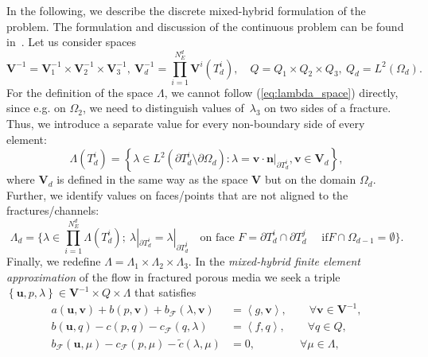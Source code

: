 In the following, we describe the discrete mixed-hybrid formulation of the
problem. The formulation and discussion of the continuous problem can be found
in~\cite{Brezina-2010-MHF}. Let us consider spaces%
\begin{equation}
\mathbf{V}^{-1}=\mathbf{V}_{1}^{-1}\times\mathbf{V}_{2}^{-1}\times
\mathbf{V}_{3}^{-1},\ \mathbf{V}_{d}^{-1}=\prod_{i=1}^{N_{E}^{d}}%
\mathbf{V}^{i}(T_{d}^{i}),\quad Q=Q_{1}\times Q_{2}\times Q_{3},\ 
Q_{d}=L^{2}\left(  \Omega_{d}\right)  .
\end{equation}
For the definition of the space $\Lambda$, we cannot follow
(\ref{eq:lambda_space}) directly, since e.g. on $\Omega_{2}$, we need to
distinguish values of~$\lambda_{3}$ on two sides of a fracture. Thus, we
introduce a separate value for every non-boundary side of every element:
\begin{equation}
\Lambda(T_{d}^{i})=\left\{  \lambda\in L^{2}(\partial T_{d}^{i} \setminus \partial\Omega_d):\lambda
=\mathbf{v}\cdot\mathbf{n}|_{\partial T_{d}^{i}},\mathbf{v}\in\mathbf{V}%
_{d}\right\}  ,
\end{equation}
where $\mathbf{V}_{d}$ is defined in the same way as the space $\mathbf{V}$
but on the domain $\Omega_{d}$. Further, we identify values on faces/points
that are not aligned to the fractures/channels:
\begin{equation}
\Lambda_{d}=\Big\{\lambda\in\prod_{i=1}^{N_{E}^{d}}\Lambda(T_{d}%
^{i});\ \lambda|_{\partial T_{d}^{i}}=\lambda|_{\partial T_{d}^{j}}%
\quad\text{on face }F=\partial T_{d}^{i}\cap\partial T_{d}^{j}\quad\text{ if
}F\cap\Omega_{d-1}=\emptyset\Big\}.
\end{equation}
Finally, we redefine $\Lambda=\Lambda_{1}\times\Lambda_{2}\times\Lambda_{3}$.
In the \emph{mixed-hybrid finite element approximation} of the flow in
fractured porous media we seek a triple $\left\{  \mathbf{u},p,\lambda
\right\}  \in\mathbf{V}^{-1}\times Q\times\Lambda$ that satisfies
\begin{align}
a\left(  \mathbf{u},\mathbf{v}\right)  +b\left(  p,\mathbf{v}\right)
+b_{\mathcal{F}}\left(  \lambda,\mathbf{v}\right)   &  =\left\langle
g,\mathbf{v}\right\rangle ,\qquad\forall\mathbf{v\in V}^{-1}%
,\label{eq:hybrid-frac-1}\\
b\left(  \mathbf{u},q\right)  -c\left(  p,q\right)  -c_{\mathcal{F}%
}\left(  q,\lambda\right)   &  =\left\langle f,q\right\rangle
,\qquad\forall q\in Q,\label{eq:hybrid-frac-2}\\
b_{\mathcal{F}}\left(  \mathbf{u},\mu\right)  -c_{\mathcal{F}}\left(
p,\mu\right)  -\widetilde{c}\left(  \lambda,\mu\right)   &  =0,\qquad
\qquad\forall\mu\in\Lambda, \label{eq:hybrid-frac-3}
\end{align}
